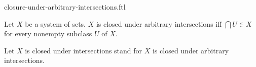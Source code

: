 \documentclass{naproche-library}
\begin{document}
\begin{smodule}[title=Closure Under Arbitrary Intersections]{closure-under-arbitrary-intersections.ftl}

\begin{definition}[forthel,id=FOUNDATIONS_14_2369621166391296]
  Let $X$ be a system of sets.
  $X$ is closed under arbitrary intersections iff $\bigcap U \in X$ for every nonempty subclass $U$ of $X$.

  Let $X$ is closed under intersections stand for $X$ is closed under arbitrary intersections.
\end{definition}
\end{smodule}
\end{document}
